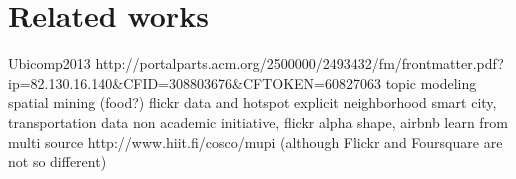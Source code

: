 \chapter{Related works}
\label{chap:related}

Ubicomp2013 http://portalparts.acm.org/2500000/2493432/fm/frontmatter.pdf?ip=82.130.16.140&CFID=308803676&CFTOKEN=60827063
topic modeling
spatial mining (food?)
flickr data and hotspot
explicit neighborhood
smart city, transportation data
non academic initiative, flickr alpha shape, airbnb
learn from multi source http://www.hiit.fi/cosco/mupi (although Flickr and
Foursquare are not so different)
